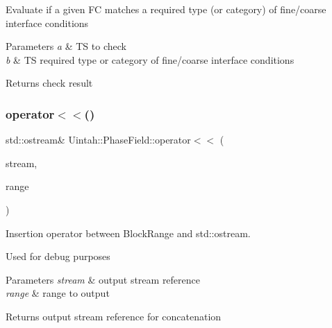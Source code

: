 Evaluate if a given FC matches a required type (or category) of fine/coarse interface conditions 
\begin{DoxyParams}{Parameters}
{\em a} & TS to check \\
\hline
{\em b} & TS required type or category of fine/coarse interface conditions \\
\hline
\end{DoxyParams}
\begin{DoxyReturn}{Returns}
check result 
\end{DoxyReturn}
\mbox{\label{namespaceUintah_1_1PhaseField_af380c33ff438112a2ddff1a51432d4ce}} 
\subsubsection{\texorpdfstring{operator$<$$<$()}{operator<<()}\hspace{0.1cm}{\footnotesize\ttfamily [1/2]}}
{\footnotesize\ttfamily std\+::ostream\& Uintah\+::\+Phase\+Field\+::operator$<$$<$ (\begin{DoxyParamCaption}\item[{std\+::ostream \&}]{stream,  }\item[{const Block\+Range \&}]{range }\end{DoxyParamCaption})\hspace{0.3cm}{\ttfamily [inline]}}



Insertion operator between Block\+Range and std\+::ostream. 

Used for debug purposes


\begin{DoxyParams}{Parameters}
{\em stream} & output stream reference \\
\hline
{\em range} & range to output \\
\hline
\end{DoxyParams}
\begin{DoxyReturn}{Returns}
output stream reference for concatenation 
\end{DoxyReturn}
\mbox{\label{namespaceUintah_1_1PhaseField_a2db17c3638c3df36c1050d6a89d0dbd5}} 
